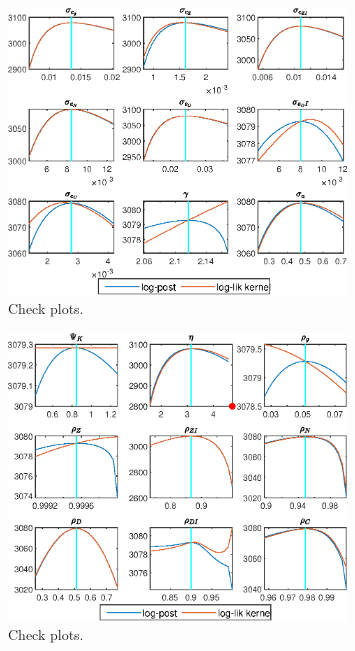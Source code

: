  
\begin{figure}[H]
\centering 
\includegraphics[width=0.80\textwidth]{BRS_pred_labor/graphs/BRS_pred_labor_CheckPlots1}
\caption{Check plots.}\label{Fig:CheckPlots:1}
\end{figure}
 
\begin{figure}[H]
\centering 
\includegraphics[width=0.80\textwidth]{BRS_pred_labor/graphs/BRS_pred_labor_CheckPlots2}
\caption{Check plots.}\label{Fig:CheckPlots:2}
\end{figure}
 
